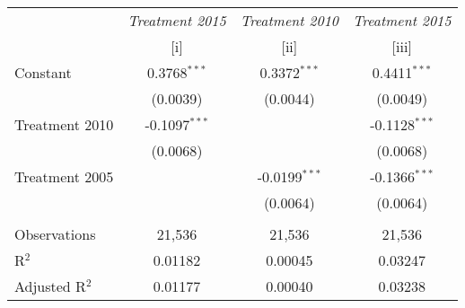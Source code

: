 
\begingroup
\centering
\begin{tabular}{lccc}
   \toprule
                   & \textit{Treatment 2015}  & \textit{Treatment  2010}  & \textit{Treatment 2015}\\   
                   & [i]                      & [ii]                      & [iii]\\  
   \midrule 
   Constant        & 0.3768$^{***}$           & 0.3372$^{***}$            & 0.4411$^{***}$\\   
                   & (0.0039)                 & (0.0044)                  & (0.0049)\\   
   Treatment  2010 & -0.1097$^{***}$          &                           & -0.1128$^{***}$\\   
                   & (0.0068)                 &                           & (0.0068)\\   
   Treatment 2005  &                          & -0.0199$^{***}$           & -0.1366$^{***}$\\   
                   &                          & (0.0064)                  & (0.0064)\\   
    \\
   Observations    & 21,536                   & 21,536                    & 21,536\\  
   R$^2$           & 0.01182                  & 0.00045                   & 0.03247\\  
   Adjusted R$^2$  & 0.01177                  & 0.00040                   & 0.03238\\  
   \bottomrule
\end{tabular}
\par\endgroup


